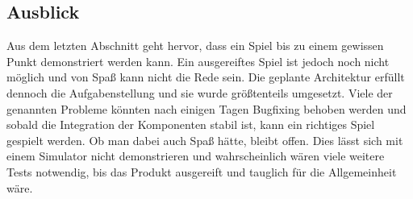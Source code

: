 \subsection{Ausblick}

Aus dem letzten Abschnitt geht hervor, dass ein Spiel bis zu einem gewissen Punkt demonstriert
werden kann.
Ein ausgereiftes Spiel ist jedoch noch nicht möglich und von Spaß kann nicht die Rede sein.
Die geplante Architektur erfüllt dennoch die Aufgabenstellung und sie wurde größtenteils umgesetzt.
Viele der genannten Probleme könnten nach einigen Tagen Bugfixing behoben werden und sobald die
Integration der Komponenten stabil ist, kann ein richtiges Spiel gespielt werden.
Ob man dabei auch Spaß hätte, bleibt offen.
Dies lässt sich mit einem Simulator nicht demonstrieren und wahrscheinlich wären viele weitere Tests
notwendig, bis das Produkt ausgereift und tauglich für die Allgemeinheit wäre.
